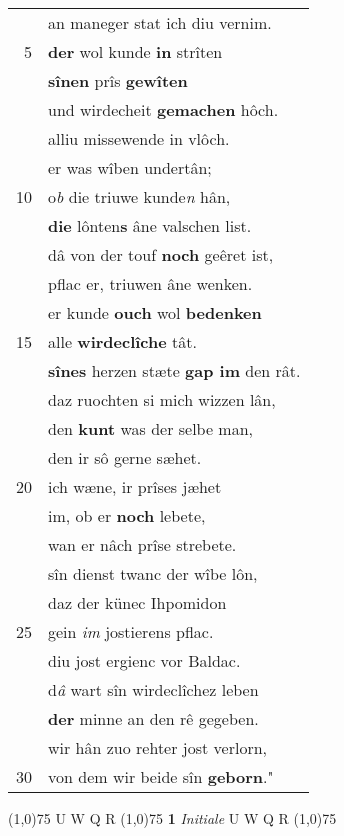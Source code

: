 \documentclass[8pt,a4paper,notitlepage]{article}
\begin{document}
\begin{table}[ht]
\begin{minipage}[t]{0.5\linewidth}
\begin{tabular}{rl}
 & an maneger stat ich diu vernim.\\ 
5 & \textbf{der} wol kunde \textbf{in} strîten\\ 
 & \textbf{sînen} prîs \textbf{gewîten}\\ 
 & und wirdecheit \textbf{gemachen} hôch.\\ 
 & alliu missewende in vlôch.\\ 
 & er was wîben undertân;\\ 
10 & o\textit{b} die triuwe kunde\textit{n} hân,\\ 
 & \textbf{die} lônten\textbf{s} âne valschen list.\\ 
 & dâ von der touf \textbf{noch} geêret ist,\\ 
 & pflac er, triuwen âne wenken.\\ 
 & er kunde \textbf{ouch} wol \textbf{bedenken}\\ 
15 & alle \textbf{wirdeclîche} tât.\\ 
 & \textbf{sînes} herzen stæte \textbf{gap im} den rât.\\ 
 & daz ruochten si mich wizzen lân,\\ 
 & den \textbf{kunt} was der selbe man,\\ 
 & den ir sô gerne sæhet.\\ 
20 & ich wæne, ir prîses jæhet\\ 
 & im, ob er \textbf{noch} lebete,\\ 
 & wan er nâch prîse strebete.\\ 
 & sîn dienst twanc der wîbe lôn,\\ 
 & daz der künec Ihpomidon\\ 
25 & gein \textit{im} jostierens pflac.\\ 
 & diu jost ergienc vor Baldac.\\ 
 & d\textit{â} wart sîn wirdeclîchez leben\\ 
 & \textbf{der} minne an den rê gegeben.\\ 
 & wir hân zuo rehter jost verlorn,\\ 
30 & von dem wir beide sîn \textbf{geborn}."\\ 
\end{tabular}
\scriptsize
\line(1,0){75} \newline
U W Q R \newline
\line(1,0){75} \newline
\textbf{1} \textit{Initiale} U W Q R  \newline
\line(1,0){75} \newline

\end{minipage}
\end{table}
\end{document}

